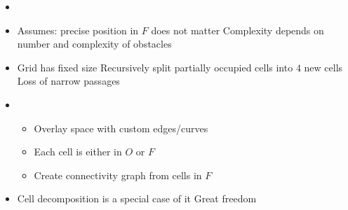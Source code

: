 \begin{itemize}
\begin{itemize}
\begin{itemize}
                    \item
                    \item Assumes: precise position in $F$ does not matter
                        \icon Complexity depends on number and complexity of obstacles
                \end{itemize}
                \begin{itemize}
                    \item
                         Grid has fixed size
                         Recursively split partially occupied cells into $4$ new cells
                        \icon Loss of narrow passages
                \end{itemize}
                \begin{itemize}
                    \item
                        \begin{itemize}
                            \item Overlay space with custom edges/curves
                            \item Each cell is either in $O$ or $F$
                            \item Create connectivity graph from cells in $F$
                        \end{itemize}
                    \item Cell decomposition is a special case of it
                    \ipro Great freedom

\end{itemize}
\end{itemize}
\end{itemize}
